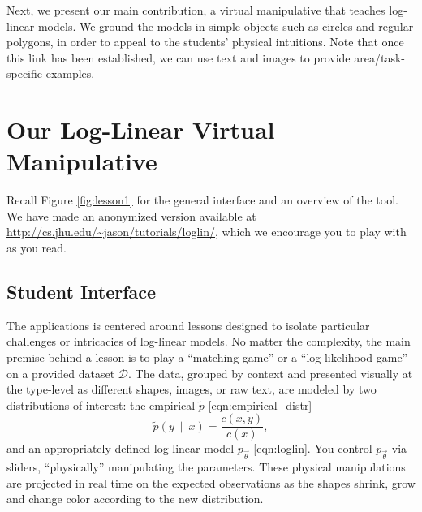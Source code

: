 \documentclass[11pt,letterpaper]{article}
\newcommand{\empirical}[0]{\ensuremath{\tilde{p}}}
\newcommand{\Data}[0]{\ensuremath{\mathcal{D}}}
\newcommand{\WhereToFind}[0]{\url{http://cs.jhu.edu/~jason/tutorials/loglin/}}
\begin{document}
Next, we present our main contribution, a virtual manipulative that teaches log-linear models. We ground 
the models in simple objects such as circles and regular polygons, in order to appeal to the 
students' physical intuitions. Note that once this link has been established, we can use text and images to 
provide area/task-specific examples.


\section{Our Log-Linear Virtual Manipulative}\label{sec:overview}

Recall Figure \ref{fig:lesson1} for the general interface and an overview 
of the tool. We have made an anonymized version available at 
\WhereToFind{}, which we encourage you to play with as you
read.



\subsection{Student Interface}

The applications is centered around lessons designed to isolate particular 
challenges or intricacies of log-linear models. No matter the complexity, the main
premise behind a lesson is to play a ``matching
game'' or a ``log-likelihood game'' on a provided dataset \Data{}. The
data, grouped by context and presented visually at the type-level as
different shapes, images, or raw text, are modeled by two
distributions of interest: the empirical $\tilde{p}$
\eqref{eqn:empirical_distr}
\begin{equation}
\empirical\left(y\ \mid\ x\right) = \frac{c(x,y)}{c(x)},
\label{eqn:empirical_distr}
\end{equation} 
and an appropriately defined log-linear
model $p_{\vec{\theta}}$ \eqref{eqn:loglin}. You control $p_{\vec{\theta}}$ 
via sliders, ``physically'' manipulating the parameters. These physical 
manipulations are projected in real time on the expected observations as the 
shapes shrink, grow and change color according to the new distribution. 
\end{document}
